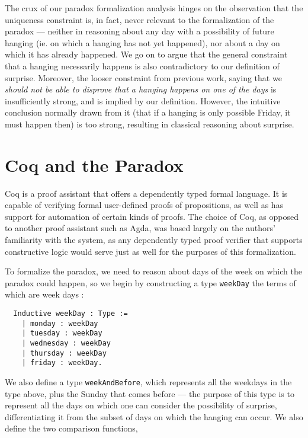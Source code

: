 \documentclass[journal]{journal}
\begin{document}
The crux of our paradox formalization analysis hinges on the observation that the uniqueness constraint
  is, in fact, never relevant to the formalization of the paradox --- neither in reasoning about
  any day with a possibility of future hanging (ie. on which
  a hanging has not yet happened), nor about a day on which it has already happened.
  We go on to argue that the general constraint that a hanging necessarily happens is
   also contradictory to our definition of surprise. Moreover, the looser constraint
  from previous work,
  saying that we \emph{should not be able to disprove that a hanging happens on one of the
  days} is insufficiently strong, and is implied by our definition.
  However, the intuitive conclusion normally drawn from it
  (that if a hanging is only possible Friday, it must happen then)
  is too strong, resulting in classical reasoning about surprise.


\section{Coq and the Paradox}
\label{sec:form}

Coq is a proof assistant that offers a dependently typed formal language.
It is capable of verifying formal user-defined proofs of propositions, as well as has support
for automation of certain kinds of proofs. The choice of Coq, as opposed to another
proof assistant such as Agda, was based largely on the authors' familiarity with the system,
as any dependently typed proof verifier that supports constructive logic
would serve just as well for the purposes of this formalization.

To formalize the paradox, we need to reason about days of the week on which
the paradox could happen, so we
begin by constructing a type {\tt weekDay} the terms of which are week days :

\begin{lstlisting}
  Inductive weekDay : Type :=
    | monday : weekDay
    | tuesday : weekDay
    | wednesday : weekDay
    | thursday : weekDay
    | friday : weekDay.
\end{lstlisting}

We also define a type {\tt weekAndBefore}, which represents all the weekdays in
the type above, plus the Sunday that comes before --- the purpose of this type is to
represent all the days on which one can consider the possibility of surprise,
differentiating it from the subset of days on which the hanging can occur. We
also define the two comparison functions,
\end{document}
